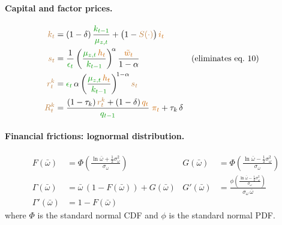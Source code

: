 \documentclass[11pt]{article}
\begin{document}
\paragraph{Capital and factor prices.}
\begin{align*}
  \textcolor{brown}{k_t}
    &= (1-\delta)\,\frac{\textcolor{green!60!black}{k_{t-1}}}{\textcolor{green!60!black}{\mu_{z,t}}}
       + \bigl(1-\textcolor{brown}{S(\cdot)}\bigr)\,\textcolor{orange!80!black}{i_t}
  \\
  \textcolor{brown}{s_t}
    &= \frac{1}{\textcolor{green!60!black}{\epsilon_t}}
       \left(\frac{\textcolor{green!60!black}{\mu_{z,t}}\,\textcolor{orange!80!black}{h_t}}
       {\textcolor{green!60!black}{k_{t-1}}}\right)^{\!\alpha}
       \frac{\textcolor{orange!80!black}{\tilde{w}_t}}{1-\alpha}
  & &\text{(eliminates eq.~10)}
  \\
  \textcolor{brown}{r_t^k}
    &= \textcolor{green!60!black}{\epsilon_t}\,\alpha
       \left(\frac{\textcolor{green!60!black}{\mu_{z,t}}\,\textcolor{orange!80!black}{h_t}}
       {\textcolor{green!60!black}{k_{t-1}}}\right)^{\!1-\alpha}\textcolor{brown}{s_t}
  \\
  \textcolor{brown}{R_t^k}
    &= \frac{(1-\tau_k)\,\textcolor{brown}{r_t^k} + (1-\delta)\,\textcolor{orange!80!black}{q_t}}
       {\textcolor{green!60!black}{q_{t-1}}}\;\textcolor{orange!80!black}{\pi_t}
       + \tau_k\,\delta
\end{align*}

\paragraph{Financial frictions: lognormal distribution.}
\begin{align*}
  F(\bar\omega) &= \Phi\!\left(\frac{\ln\bar\omega + \tfrac{1}{2}\sigma_\omega^2}{\sigma_\omega}\right)
  &
  G(\bar\omega) &= \Phi\!\left(\frac{\ln\bar\omega - \tfrac{1}{2}\sigma_\omega^2}{\sigma_\omega}\right)
  \\
  \Gamma(\bar\omega) &= \bar\omega\,(1-F(\bar\omega)) + G(\bar\omega)
  &
  G'(\bar\omega) &= \frac{\phi\!\left(\frac{\ln\bar\omega - \tfrac{1}{2}\sigma_\omega^2}{\sigma_\omega}\right)}
    {\sigma_\omega\,\bar\omega}
  \\
  \Gamma'(\bar\omega) &= 1 - F(\bar\omega)
\end{align*}
where $\Phi$ is the standard normal CDF and $\phi$ is the standard normal PDF.
\end{document}
